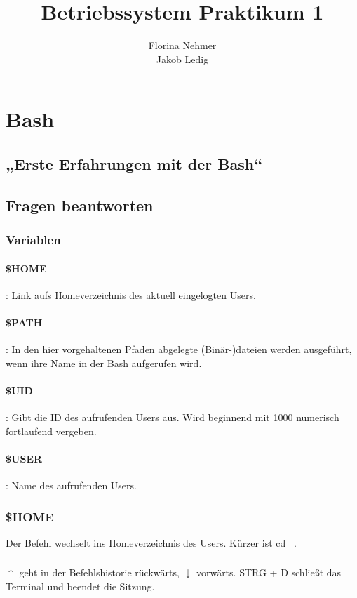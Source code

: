 \documentclass[]{article}
\title{Betriebssystem Praktikum 1}
\author{Florina Nehmer\\
Jakob Ledig}
\begin{document}
\maketitle

\section{Bash}
\subsection{„Erste Erfahrungen mit der Bash“}

\subsection{Fragen beantworten}
\subsubsection{Variablen}
\paragraph{\$HOME}: Link aufs Homeverzeichnis des aktuell eingelogten Users.
\paragraph{\$PATH}: In den hier vorgehaltenen Pfaden abgelegte (Binär-)dateien werden ausgeführt, wenn ihre Name in der Bash aufgerufen wird.
\paragraph{\$UID}: Gibt die ID des aufrufenden Users aus. Wird beginnend mit 1000 numerisch fortlaufend vergeben.
\paragraph{\$USER}: Name des aufrufenden Users.

\subsubsection{\$HOME}
Der Befehl wechselt ins Homeverzeichnis des Users. Kürzer ist cd ~.

\subsubsection{}
$\uparrow$ geht in der Befehlshistorie rückwärts, $\downarrow$ vorwärts. STRG + D schließt das Terminal und beendet die Sitzung.
\end{document}

